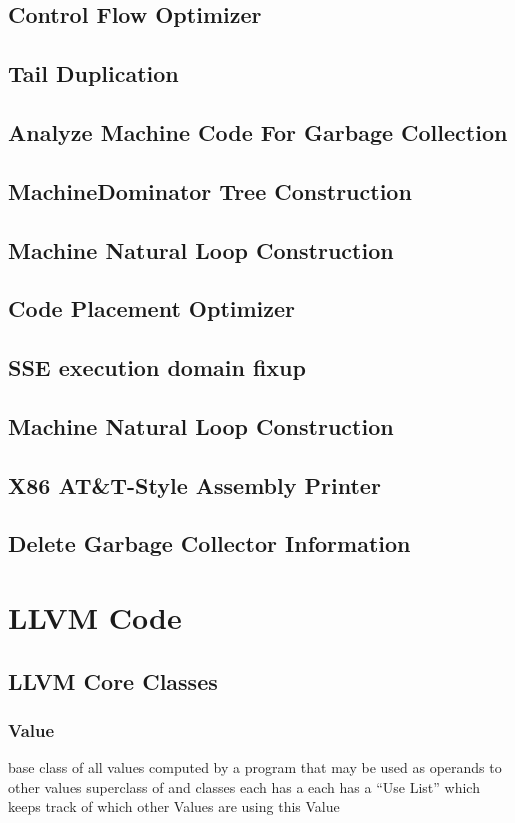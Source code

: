\documentclass{myproc}
\begin{document}
\subsection{Control Flow Optimizer}
\subsection{Tail Duplication}
\subsection{Analyze Machine Code For Garbage Collection}
\subsection{MachineDominator Tree Construction}
\subsection{Machine Natural Loop Construction}
\subsection{Code Placement Optimizer}
\subsection{SSE execution domain fixup}
\subsection{Machine Natural Loop Construction}
\subsection{X86 AT\&T-Style Assembly Printer}
\subsection{Delete Garbage Collector Information}


\section{LLVM Code}
\subsection{LLVM Core Classes}
\subsubsection{Value}
\bit
\w base class of all values computed by a program that may be used as operands
to other values 
\w superclass of  and  classes
\w each  has a 
\w each  has a ``Use List'' which keeps track of which other Values
are using this Value
\eit
\end{document}
